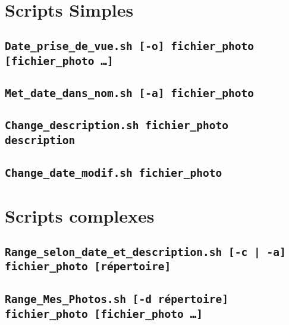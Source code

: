 \documentclass[a4paper, 11pt]{article}
\begin{document}
	\maketitle
	\section{Scripts Simples}
	\subsection{\texttt{Date\_prise\_de\_vue.sh [-o] fichier\_photo [fichier\_photo \ldots]}}
	\subsection{\texttt{Met\_date\_dans\_nom.sh [-a] fichier\_photo}}
	\subsection{\texttt{Change\_description.sh fichier\_photo description}}
	\subsection{\texttt{Change\_date\_modif.sh fichier\_photo}}
	\section{Scripts complexes}
	\subsection{\texttt{Range\_selon\_date\_et\_description.sh [-c | -a] fichier\_photo [répertoire]}}
	\subsection{\texttt{Range\_Mes\_Photos.sh [-d répertoire] fichier\_photo [fichier\_photo \ldots]}}
\end{document}
